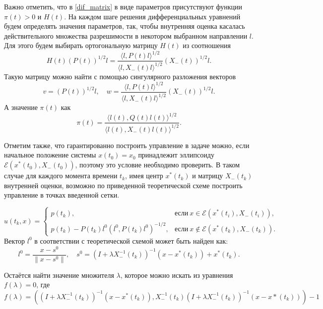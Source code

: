 Важно отметить, что в \eqref{dif_matrix} в виде параметров присутствуют
 функции \( \pi(t) > 0 \) и \( H(t) \). На каждом шаге
 решения дифференциальных уравнений будем определять значения параметров, так, чтобы внутренняя оценка
 касалась действительного множества разрешимости в некотором выбранном направлении \( l \).
 Для этого будем выбирать ортогональную матрицу \( H(t) \) из соотношения
\begin{equation*}
    H(t)(P(t))^{1/2} l = \frac{\langle l, P(t) l \rangle^{1/2}}{\langle l, X_-(t) l \rangle^{1/2}} (X_-(t))^{1/2} l.
\end{equation*}
Такую матрицу можно найти с помощью сингулярного разложения векторов
\begin{equation*}
    v = (P(t))^{1/2} l, \quad w = \frac{\langle l, P(t) l \rangle^{1/2}}{\langle l, X_-(t) l \rangle^{1/2}} (X_-(t))^{1/2} l.
\end{equation*}
А значение \( \pi(t) \) как
\begin{equation*}
    \pi(t) = \frac{\langle l(t), Q(t) l(t) \rangle^{1/2}}{\langle l(t), X_-(t) l(t) \rangle^{1/2}}.
\end{equation*}

Отметим также, что гарантированно построить управление в задаче можно, если начальное положение
 системы \( x(t_0) = x_0 \) принадлежит эллипсоиду \( \mathcal{E}(x^*(t_0), X_-(t_0)) \), 
 поэтому это условие необходимо проверить. В таком случае для каждого момента времени \( t_k \), имея
 центр \( x^*(t_k) \) и матрицу \( X_-(t_k) \) внутренней оценки, возможно по приведенной теоретической
 схеме построить управление в точках введенной сетки.

\begin{equation*}
    u(t_k, x) = \begin{cases}
        p(t_k), & \text{если} \ x \in \mathcal{E}(x^*(t_i), X_-(t_i)), \\
        p(t_k) - P(t_k)l^0(l^0, P(t_k)l^0)^{-1/2}, & \text{если} \ x \notin \mathcal{E}(x^*(t_k), X_-(t_k)). 
    \end{cases}
\end{equation*}
Вектор \( l^0 \) в соответствии с теоретической схемой может быть найден как:
\begin{equation}
    l^0 = \frac{x - s^0}{\| x - s^0 \|}, \quad s^0 = (I + \lambda X_-^{-1}(t_k))^{-1}(x - x^*(t_k)) + x^*(t_k).
\end{equation}

Остаётся найти значение множителя \( \lambda \), которое можно искать из уравнения \( f(\lambda) = 0 \), где
\begin{equation*}
    f(\lambda) = ((I + \lambda X_-^{-1}(t_k))^{-1}(x - x^*(t_k)), X_-^{-1}(t_k)(I + \lambda X_-^{-1}(t_k))^{-1}(x - x*(t_k))) - 1
\end{equation*}

